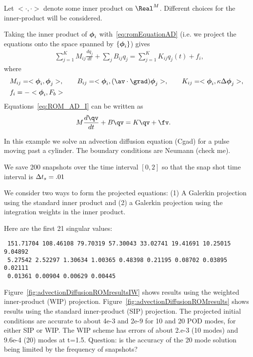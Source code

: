 Let $<\cdot,\cdot>$ denote some inner product on $\Real^M$. 
Different choices for the inner-product will be considered. 


Taking the inner product of $\boldsymbol{\phi}_i$ with~\eqref{eq:romEquationAD} (i.e. we project the equations onto the space
spanned by $\{ \boldsymbol{\phi}_i \}$) gives
\begin{align}
  &   \sum_{j=1}^K M_{ij} \frac{d q_j}{dt}  + \sum_j B_{ij} q_j  =  \sum_{j=1}^K K_{ij} q_j(t)  + f_i,  \label{eq:ROM_AD_I}
\end{align}
where 
\begin{align}
&   M_{ij} = <\phiv_i,\phiv_j>, \qquad
  B_{ij}  = <\phiv_i, (\av\cdot\grad)\phiv_j>, \qquad 
  K_{ij} = <\phiv_i,\kappa \Delta \phiv_j>, \\
&  f_i =  - <\phiv_i, F_b>
\end{align}
Equations~\ref{eq:ROM_AD_I} can be written as
\begin{align}
  &  M \frac{d\qv}{dt} + B \qv = K \qv + \fv . \label{eq:romEquationProjectedAD} 
\end{align}




 \label{sec:advectionDiffusionPastACylinder}

In this example we solve an advection diffusion equation (Cgad) for a pulse moving past a cylinder.
The boundary conditions are Neumann (check me).

We save 200 snapshots over the time interval $[0,2]$ so that the snap shot time interval is $\Delta t_s=.01$

We consider two ways to form the projected equations: (1) A Galerkin projection using the standard inner product
and (2) a Galerkin projection using the integration weights in the inner product.

Here are the first 21 singular values:
\begin{verbatim}
 151.71704 108.46108 79.70319 57.30043 33.02741 19.41691 10.25015 9.04892
 5.27542 2.52297 1.30634 1.00365 0.48398 0.21195 0.08702 0.03895 0.02111 
 0.01361 0.00904 0.00629 0.00445
\end{verbatim}

Figure~\ref{fig:advectionDiffusionROMresultsIW} shows results using the weighted inner-product (WIP) projection.
Figure~\ref{fig:advectionDiffusionROMresults} shows results using the standard inner-product (SIP) projection.
The projected initial conditions are accurate to about 4e-3 and 2e-9 for 10 and 20 POD modes, for either SIP or WIP.
The WIP scheme has errors of about 2.e-3 (10 modes) and 9.6e-4 (20) modes at t=1.5. Question: is the accuracy of the 20 mode
solution being limited by the frequency of snapshots?

